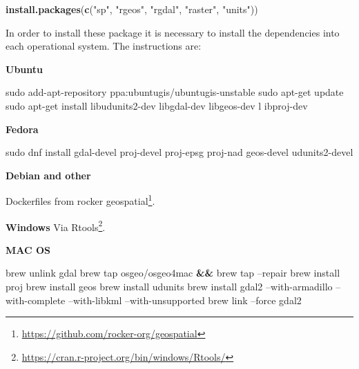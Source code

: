 \documentclass[12pt,graybox,envcountchap,sectrefs]{krantz}
\makeatletter
\newenvironment{Shaded}{\begin{snugshade}}{\end{snugshade}}
\newcommand{\KeywordTok}[1]{\textcolor[rgb]{0.13,0.29,0.53}{\textbf{#1}}}
\newcommand{\StringTok}[1]{\textcolor[rgb]{0.31,0.60,0.02}{#1}}
\newcommand{\FunctionTok}[1]{\textcolor[rgb]{0.00,0.00,0.00}{#1}}
\newcommand{\ExtensionTok}[1]{#1}
\newcommand{\NormalTok}[1]{#1}
\renewcommand{\href}[2]{#2\footnote{\url{#1}}}
\newenvironment{kframe}{%
\medskip{}
\setlength{\fboxsep}{.8em}
 \def\at@end@of@kframe{}%
 \ifinner\ifhmode%
  \def\at@end@of@kframe{\end{minipage}}%
  \begin{minipage}{\columnwidth}%
 \fi\fi%
 \def\FrameCommand##1{\hskip\@totalleftmargin \hskip-\fboxsep
 \colorbox{shadecolor}{##1}\hskip-\fboxsep
     \hskip-\linewidth \hskip-\@totalleftmargin \hskip\columnwidth}%
 \MakeFramed {\advance\hsize-\width
   \@totalleftmargin\z@ \linewidth\hsize
   \@setminipage}}%
 {\par\unskip\endMakeFramed%
 \at@end@of@kframe}
\renewenvironment{Shaded}{\begin{kframe}}{\end{kframe}}
\theoremstyle{definition}
\theoremstyle{definition}
\theoremstyle{definition}
\theoremstyle{remark}
\makeatother
\begin{document}
\begin{Shaded}
\begin{Highlighting}[]
\KeywordTok{install.packages}\NormalTok{(}\KeywordTok{c}\NormalTok{(}\StringTok{"sp"}\NormalTok{, }\StringTok{"rgeos"}\NormalTok{, }\StringTok{"rgdal"}\NormalTok{, }\StringTok{"raster"}\NormalTok{, }\StringTok{"units"}\NormalTok{))}
\end{Highlighting}
\end{Shaded}

In order to install these package it is necessary to install the
dependencies into each operational system. The instructions are:

\textbf{Ubuntu}

\begin{Shaded}
\begin{Highlighting}[]
\FunctionTok{sudo}\NormalTok{ add-apt-repository ppa:ubuntugis/ubuntugis-unstable}
\FunctionTok{sudo}\NormalTok{ apt-get update}
\FunctionTok{sudo}\NormalTok{ apt-get install libudunits2-dev libgdal-dev libgeos-dev l}
\ExtensionTok{ibproj-dev} 
\end{Highlighting}
\end{Shaded}

\textbf{Fedora}

\begin{Shaded}
\begin{Highlighting}[]
\FunctionTok{sudo}\NormalTok{ dnf install gdal-devel proj-devel proj-epsg proj-nad }
\ExtensionTok{geos-devel}\NormalTok{ udunits2-devel}
\end{Highlighting}
\end{Shaded}

\textbf{Debian and other}

Dockerfiles from \href{https://github.com/rocker-org/geospatial}{rocker
geospatial}.

\textbf{Windows} Via
\href{https://cran.r-project.org/bin/windows/Rtools/}{Rtools}.

\textbf{MAC OS}

\begin{Shaded}
\begin{Highlighting}[]
\ExtensionTok{brew}\NormalTok{ unlink gdal}
\ExtensionTok{brew}\NormalTok{ tap osgeo/osgeo4mac }\KeywordTok{&&} \ExtensionTok{brew}\NormalTok{ tap --repair}
\ExtensionTok{brew}\NormalTok{ install proj}
\ExtensionTok{brew}\NormalTok{ install geos}
\ExtensionTok{brew}\NormalTok{ install udunits}
\ExtensionTok{brew}\NormalTok{ install gdal2 --with-armadillo --with-complete }
\ExtensionTok{--with-libkml}\NormalTok{ --with-unsupported}
\ExtensionTok{brew}\NormalTok{ link --force gdal2}
\end{Highlighting}
\end{Shaded}
\end{document}
